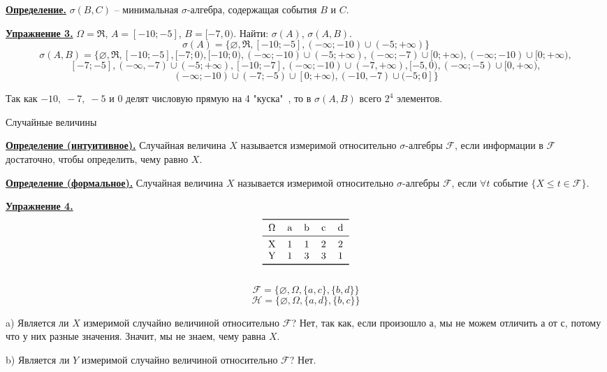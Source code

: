 \documentclass[a4paper]{article}
\begin{document}
 \par {\bf\underline{Определение.}} $\sigma(B,C)$ -- минимальная $\sigma$-алгебра, содержащая события $B$ и $C$.\\
\par {\bf\underline{Упражнение 3.}} $\Omega=\Re$, $A=[-10;-5]$, $B=[-7,0)$. Найти: $\sigma(A)$, $\sigma(A,B)$.
\[\sigma(A)=\{\varnothing,\Re,[-10;-5],(-\infty;-10)\cup(-5;+\infty)\}\]
\[\sigma(A,B)=\{\varnothing,\Re,[-10;-5],[-7;0),[-10;0),(-\infty;-10)\cup(-5;+\infty),(-\infty;-7)\cup[0;+\infty),(-\infty;-10)\cup[0;+\infty),\]
\[[-7;-5],(-\infty,-7)\cup(-5;+\infty),[-10;-7],(-\infty;-10)\cup(-7,+\infty),[-5,0),(-\infty;-5)\cup[0,+\infty),\] \[(-\infty;-10)\cup(-7;-5)\cup[0;+\infty),(-10,-7)\cup(-5;0]\}\]
\par Так как $-10,\;-7,\;-5$ и 0 делят числовую прямую на 4 "куска"\ , то в $\sigma(A,B)$ всего $2^4$ элементов.\\
\begin{center}{\large Случайные величины}\end{center}
\par {\bf\underline{Определение (интуитивное).}} Случайная величина $X$ называется измеримой относительно $\sigma$-алгебры $\mathcal{F}$, если информации в $\mathcal{F}$ достаточно, чтобы определить, чему равно $X$.\\
\par {\bf\underline{Определение (формальное).}} Случайная величина $X$ называется измеримой относительно $\sigma$-алгебры $\mathcal{F}$, если $\forall t$ событие $\{X\leq t\in\mathcal{F}\}$.\\
\par {\bf\underline{Упражнение 4.}}
\[\begin{tabular}{*{5}{c}}
\toprule
$\Omega$&a&b&c&d\\
\midrule
X&1&1&2&2\\
Y&1&3&3&1\\
\bottomrule
\end{tabular}\]\\
\[\mathcal{F}=\{\varnothing,\Omega,\{a,c\},\{b,d\}\}\]
\[\mathcal{H}=\{\varnothing,\Omega,\{a,d\},\{b,c\}\}\]
\par a) Является ли $X$ измеримой случайно величиной относительно $\mathcal{F}$? Нет, так как, если произошло а, мы не можем отличить а от с, потому что у них разные значения. Значит, мы не знаем, чему равна $X$.\\
\par b) Является ли $Y$ измеримой случайно величиной относительно $\mathcal{F}$? Нет.\\
\end{document}
